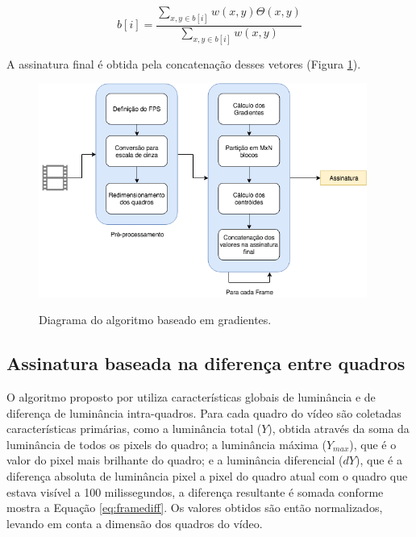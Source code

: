     
\begin{equation}
	\label{eq:gradientes}
	b[i] = \frac{\sum_{x,y \in b[i]} w(x,y)\Theta (x,y)}{\sum_{x,y \in b[i]} w(x,y)}
\end{equation}

A assinatura final é obtida pela concatenação desses vetores (Figura \ref{fig:dia_gradiente}).

 \begin{figure}[h]
      \centering
      \caption{Diagrama do algoritmo baseado em gradientes.}
      \includegraphics[width=0.96\textwidth]{dados/figuras/diagramas/Diag-Gradiente}
       	\label{fig:dia_gradiente}
    \end{figure}  
    
%
%

\subsection{Assinatura baseada na diferença entre quadros}
\label{sec:framediff}

  O algoritmo proposto por  utiliza características globais de luminância e de diferença de luminância intra-quadros. Para cada quadro do vídeo são coletadas características primárias, como a luminância total ($Y$), obtida através da soma da luminância de todos os pixels do quadro; a luminância máxima ($Y_{max}$), que é o valor do pixel mais brilhante do quadro; e a luminância diferencial ($dY$), que é a diferença absoluta de luminância pixel a pixel do quadro atual com o quadro que estava visível a 100 milissegundos, a diferença resultante é somada conforme mostra a Equação \ref{eq:framediff}. Os valores obtidos são então normalizados, levando em conta a dimensão dos quadros do vídeo.
  

